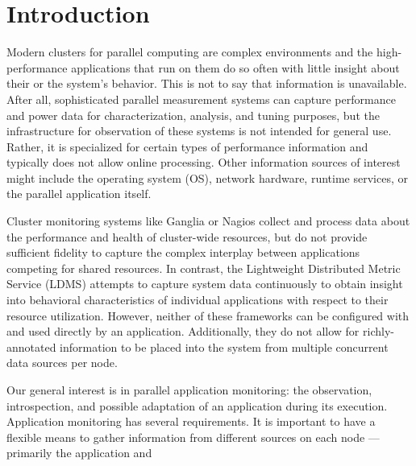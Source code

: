 \section{Introduction}
%
\par
%
Modern clusters for parallel computing are complex environments and
the high-performance applications that run on them do so often with
little insight about their or the system's behavior.
%
This is not to say that information is unavailable. 
%
After all, sophisticated parallel measurement systems can capture performance and
power data for characterization, analysis, and tuning purposes, but
the infrastructure for observation of these systems is not intended
for general use.
%
Rather, it is specialized for certain types of performance information
and typically does not allow online processing.
%
Other information sources of interest might include the
operating system (OS), network hardware, runtime services, or the
parallel application itself.
%
\par
%
Cluster monitoring systems like Ganglia \cite{massie2004ganglia} or
Nagios \cite{katsaros2011building} collect and process data about the
performance and health of cluster-wide resources, but do not provide
sufficient fidelity to capture the complex interplay between
applications competing for shared resources.
%
In contrast, the Lightweight Distributed Metric Service
\cite{agelastos2014lightweight} (LDMS) attempts to capture system data
continuously to obtain insight into behavioral characteristics of
individual applications with respect to their resource utilization.
%
%
However, neither of these frameworks can be configured with and used
directly by an application.
%
Additionally, they do not allow for richly-annotated information to be
placed into the system from multiple concurrent data sources per node.
%
\par
%
Our general interest is in parallel application monitoring: the
observation, introspection, and possible adaptation of an application
during its execution.
%
Application monitoring has several requirements.
%
%
It is important to have a flexible means to gather information from
different sources on each node --- primarily the application and
